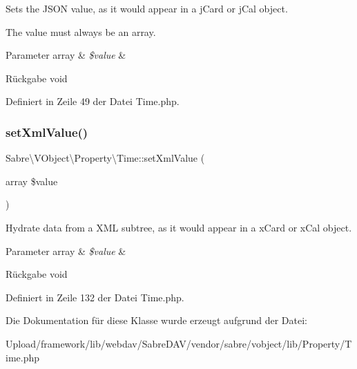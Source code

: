 Sets the J\+S\+ON value, as it would appear in a j\+Card or j\+Cal object.

The value must always be an array.


\begin{DoxyParams}[1]{Parameter}
array & {\em \$value} & \\
\hline
\end{DoxyParams}
\begin{DoxyReturn}{Rückgabe}
void 
\end{DoxyReturn}


Definiert in Zeile 49 der Datei Time.\+php.

\mbox{\label{class_sabre_1_1_v_object_1_1_property_1_1_time_ac99cf739ce4cfab3000d23ce0df4905b}} 
\subsubsection{\texorpdfstring{set\+Xml\+Value()}{setXmlValue()}}
{\footnotesize\ttfamily Sabre\textbackslash{}\+V\+Object\textbackslash{}\+Property\textbackslash{}\+Time\+::set\+Xml\+Value (\begin{DoxyParamCaption}\item[{array}]{\$value }\end{DoxyParamCaption})}

Hydrate data from a X\+ML subtree, as it would appear in a x\+Card or x\+Cal object.


\begin{DoxyParams}[1]{Parameter}
array & {\em \$value} & \\
\hline
\end{DoxyParams}
\begin{DoxyReturn}{Rückgabe}
void 
\end{DoxyReturn}


Definiert in Zeile 132 der Datei Time.\+php.



Die Dokumentation für diese Klasse wurde erzeugt aufgrund der Datei\+:\begin{DoxyCompactItemize}
\item 
Upload/framework/lib/webdav/\+Sabre\+D\+A\+V/vendor/sabre/vobject/lib/\+Property/Time.\+php\end{DoxyCompactItemize}
